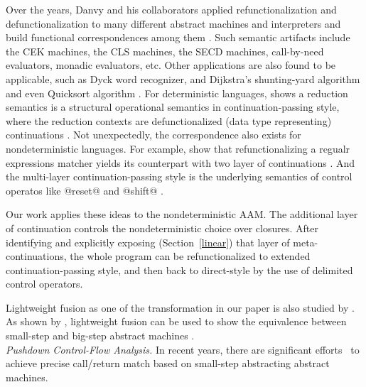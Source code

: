 \documentclass[acmsmall, review]{acmart}\settopmatter{}
\begin{document}
Over the years, Danvy and his collaborators applied refunctionalization and defunctionalization 
to many different abstract machines and interpreters and build functional correspondences among
them \cite{Ager:2003:FCE:888251.888254, Danvy:2001:DW:773184.773202, danvy2004refocusing,
Danvy:2008:DIP:1411204.1411206, AGER2004223, ager2005functional, Danvy:2006:RW:2171265.2171268,
DANVY2009534, danvy2009towards, biernacka2009towards}. Such semantic artifacts include the CEK machines,
the CLS machines, the SECD machines, call-by-need evaluators, monadic evaluators, etc.
Other applications are also found to be applicable, such as Dyck word recognizer, and 
Dijkstra's shunting-yard algorithm and even Quicksort algorithm \cite{Danvy:2006:RW:2171265.2171268,
DANVY2009534}.
For deterministic languages, \citeauthor{Danvy:2008:DIP:1411204.1411206} shows a reduction semantics
is a structural operational semantics in continuation-passing style, where the reduction contexts
are defunctionalized (data type representing) continuations \cite{Danvy:2008:DIP:1411204.1411206}.
Not unexpectedly, the correspondence also exists for nondeterministic languages. For example,
\citeauthor{Danvy:2001:DW:773184.773202} show that refunctionalizing a regualr expressions matcher yields
its counterpart with two layer of continuations \cite{Danvy:2001:DW:773184.773202}.
And the multi-layer continuation-passing style is the underlying semantics of control operatos
like @reset@ and @shift@ \cite{Danvy:1990:AC:91556.91622}. 

Our work applies these ideas to the nondeterministic AAM. The additional layer of continuation controls
the nondeterministic choice over closures. After identifying and explicitly exposing (Section~\ref{linear})
that layer of meta-continuations, the whole program can be refunctionalized to extended
continuation-passing style, and then back to direct-style by the use of delimited control operators.

Lightweight fusion as one of the transformation in our paper is also studied by 
\citeauthor{Ohori:2007:LFF:1190216.1190241} \cite{Ohori:2007:LFF:1190216.1190241}.
As shown by \citeauthor{DANVY2008100}, lightweight fusion can be used to show the 
equivalence between small-step and big-step abstract machines \cite{DANVY2008100}.\\

\textit{Pushdown Control-Flow Analysis.}
In recent years, there are significant efforts~\cite{vardoulakis2010cfa2, earl2012introspective,
gilray2016pushdown, johnson2015abstracting} to achieve precise call/return match based on small-step
abstracting abstract machines.
\end{document}

